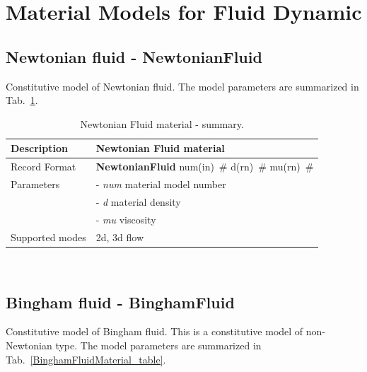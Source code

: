 \documentclass[a4paper]{article}
\newcommand{\descitem}[1]{{\noindent \bf #1}}
\newcommand{\elemparam}[2]{{{#1\tiny (#2)}~\#}}
\newcommand{\param}[1]{{\it #1}}
\newenvironment{mmt}{\begin{tabular}{|l|p{9cm}|}}{\end{tabular}\\}
\newenvironment{mmt}{\begin{tabular}{|l|l|}}{\end{tabular}\\}
\begin{document}
\section{Material Models for Fluid Dynamic}
\subsection{Newtonian fluid - NewtonianFluid}
\label{NewtonianFluidMaterial}
Constitutive model of Newtonian fluid. The model parameters are summarized
in Tab.~\ref{NewtonianFluidMaterial_table}.

\begin{table}[!htb]
\begin{mmt}
\hline
Description & Newtonian Fluid material\\
\hline
Record Format & \descitem{NewtonianFluid} \elemparam{num}{in}
\elemparam{d}{rn} \elemparam{mu}{rn}\\
Parameters &- \param{num} material model number\\
&- \param{d} material density\\
&- \param{mu} viscosity\\
Supported modes& 2d, 3d flow\\
\hline
\end{mmt}
\caption{Newtonian Fluid material - summary.}
\label{NewtonianFluidMaterial_table}
\end{table}



\subsection{Bingham fluid - BinghamFluid}
\label{BinghamFluidMaterial}
Constitutive model of Bingham fluid. This is a constitutive model of
non-Newtonian type. The model parameters are summarized
in Tab.~\ref{BinghamFluidMaterial_table}.
\end{document}
